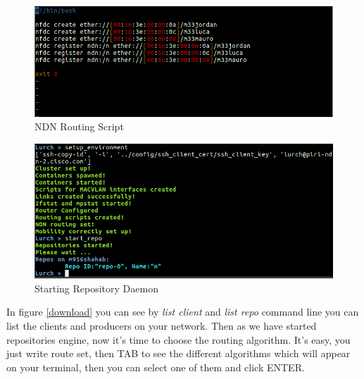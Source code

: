 \begin{figure}[H]

\begin{center}

\includegraphics[scale = 0.35]{Pictures/script.png}

\caption{NDN Routing Script} \label{script} 

\end{center}

\end{figure}


\begin{figure}[H]

\begin{center}

\includegraphics[scale = 0.35]{Pictures/start_repo.png}

\caption{Starting Repository Daemon} \label{repo} 

\end{center}

\end{figure}




In figure \ref{download} you can see by \textit{list client} and \textit{list repo} command line you can list the clients and producers on your network. Then as we have started repositories engine, now it's time to choose the routing algorithm. It's easy, you just write route set, then TAB to see the different algorithms which will appear on your terminal, then you can select one of them and click ENTER.

